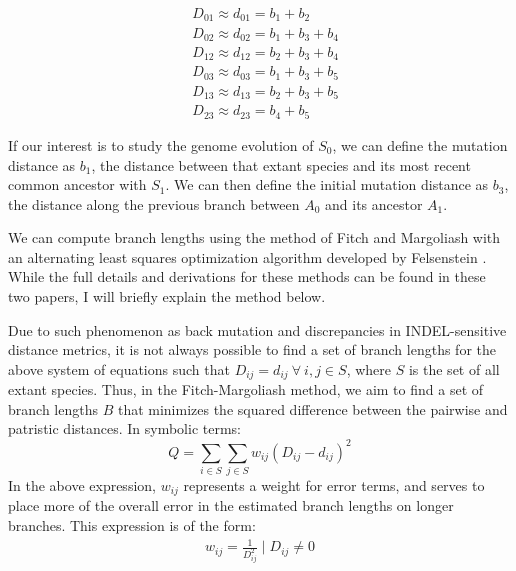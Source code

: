 \documentclass{article} %
\begin{document}
\begin{equation}
\begin{split}
&D_{01} \approx d_{01} = b_1 + b_2\\
&D_{02} \approx d_{02} = b_1 + b_3 + b_4\\
&D_{12} \approx d_{12} = b_2+b_3+b_4\\
&D_{03} \approx d_{03} = b_1+b_3+b_5\\
&D_{13} \approx d_{13} = b_2+b_3+b_5\\
&D_{23} \approx d_{23} = b_4+b_5
\end{split}
\end{equation}

If our interest is to study the genome evolution of $S_0$, we can define the mutation distance as $b_1$, the distance between that extant species and its most recent common ancestor with $S_1$. We can then define the initial mutation distance as $b_3$, the distance along the previous branch between $A_0$ and its ancestor $A_1$.\par
We can compute branch lengths using the method of Fitch and Margoliash \cite{pmid5334057} with an alternating least squares optimization algorithm developed by Felsenstein \cite{pmid11975348}. While the full details and derivations for these methods can be found in these two papers, I will briefly explain the method below.\par
Due to such phenomenon as back mutation and discrepancies in INDEL-sensitive distance metrics, it is not always possible to find a set of branch lengths for the above system of equations such that $D_{ij} = d_{ij} \: \forall \: i,j \in S$, where $S$ is the set of all extant species. Thus, in the Fitch-Margoliash method, we aim to find a set of branch lengths $B$ that minimizes the squared difference between the pairwise and patristic distances. In symbolic terms:
\begin{equation*}
	Q = \sum_{i \in S}\sum_{j \in S}w_{ij}(D_{ij} - d_{ij})^2
\end{equation*}
In the above expression, $w_{ij}$ represents a weight for error terms, and serves to place more of the overall error in the estimated branch lengths on longer branches. This expression is of the form:
\begin{equation*}
\begin{split}
	w_{ij} = \frac{1}{D_{ij}^2} \mid D_{ij} \ne 0\\
\end{split}
\end{equation*}
\end{document}

